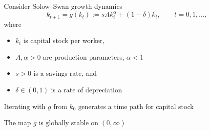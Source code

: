 \begin{frame}
    
    \Eg Consider Solow--Swan growth dynamics 
    \begin{equation*}
        \label{eq:solow}
        k_{t+1} = g(k_t) := s A k_t^\alpha + (1 - \delta) k_t,
        \qquad t = 0, 1, \ldots,
    \end{equation*}
    where 
    \begin{itemize}
        \item $k_t$ is capital stock per worker,
        \item $A, \alpha >0$ are production parameters, $\alpha < 1$
        \item $s > 0$ is a savings rate, and
        \item $\delta \in (0,1)$ is a rate of depreciation  
    \end{itemize}

    Iterating with $g$ from $k_0$ generates a time path for capital stock

    The map $g$ is globally stable on $(0, \infty)$

\end{frame}

